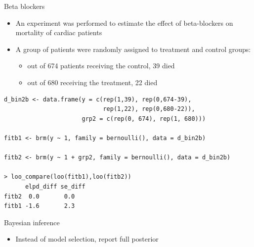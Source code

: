 \documentclass[english,t]{beamer}
\begin{document}
\begin{frame}[fragile]{Beta blockers}

\begin{itemize}
  \item An experiment was performed to estimate the effect of
    beta-blockers on mortality of cardiac patients
  \item A group of
    patients were randomly assigned to treatment and control groups:
    \begin{itemize}
    \item out of 674 patients receiving the control, 39 died
    \item out of 680 receiving the treatment, 22 died
    \end{itemize}
  \end{itemize}

{\footnotesize
\begin{lstlisting}
d_bin2b <- data.frame(y = c(rep(1,39), rep(0,674-39),
                            rep(1,22), rep(0,680-22)),
                      grp2 = c(rep(0, 674), rep(1, 680)))

fitb1 <- brm(y ~ 1, family = bernoulli(), data = d_bin2b)

fitb2 <- brm(y ~ 1 + grp2, family = bernoulli(), data = d_bin2b)

> loo_compare(loo(fitb1),loo(fitb2))
      elpd_diff se_diff
fitb2  0.0       0.0   
fitb1 -1.6       2.3   
\end{lstlisting}}

\end{frame}

\begin{frame}{Bayesian inference}

  \begin{itemize}
  \item Instead of model selection, report full posterior 
    \begin{itemize}
    \end{itemize}
  \end{itemize}
  
  
\end{frame}
\end{document}
